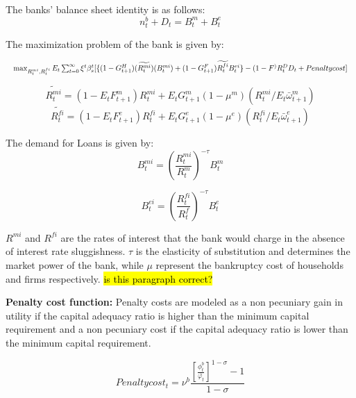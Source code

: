\documentclass[12pt]{article}
\numberwithin{equation}{section}
\begin{document}
The banks' balance sheet identity is as follows:
\begin{equation}
n^b_{t}+D_{t}=B^m_{t}+B^e_{t}
\end{equation}

The maximization problem of the bank is given by:

\begin{equation}
\resizebox{1\textwidth}{!}{$
	\max_{R^{mi}_t,R^{fi}_t}E_t\sum _{t=0}^{\infty }\xi^t\beta_{s}^t [\{(1-G^H_{t+1}) (\widetilde{R^{mi}_{t}})(B^{mi}_{t})+(1-G^F_{t+1})\widetilde{R^{fi}_{t}}B^{ei}_{t}\}-(1-F^){R^D_{t}}D_{t}+Penalty cost]$}
\end{equation}



\begin{equation}
\widetilde{R^{mi}_{t}}=(1-E_tF^m_{t+1})R^{mi}_t+E_tG^m_{t+1}(1 - \mu^m)( R^{mi}_t/E_t\bar{\omega}^m_{t+1})
\end{equation}
\begin{equation}
\widetilde{R^{fi}_{t}}=(1-E_tF^e_{t+1})R^{fi}_t+E_tG^e_{t+1}(1 - \mu^e)( R^{fi}_t/E_t\bar{\omega}^e_{t+1})
\end{equation}

The demand for Loans is given by:
\begin{equation}
B^{mi}_t=(\frac{R^{mi}_t}{R^{m}_t})^{-\tau} B^{m}_t
\end{equation}

\begin{equation}
B^{ei}_t=(\frac{R^{fi}_t}{R^{f}_t})^{-\tau} B^{e}_t
\end{equation}



$R^{mi}$ and $R^{fi}$ are the rates of interest that the bank would charge in the absence of interest rate sluggishness. $\tau$ is the elasticity of substitution and determines the market power of the bank, while $\mu$ represent the bankruptcy cost of households and firms respectively. \hl{is this paragraph correct?}

\textbf{Penalty cost function:}
Penalty costs are modeled as a non pecuniary gain in utility if the capital adequacy ratio is higher than the minimum capital requirement and a non pecuniary cost if the capital adequacy ratio is lower than the minimum capital requirement.

\begin{equation}
Penalty cost_t=\nu^b \frac{[\frac{\phi^b_t}{\bar{\varphi_t}}]^{1-\sigma}-1}{{1-\sigma}}
\end{equation}
\end{document}
